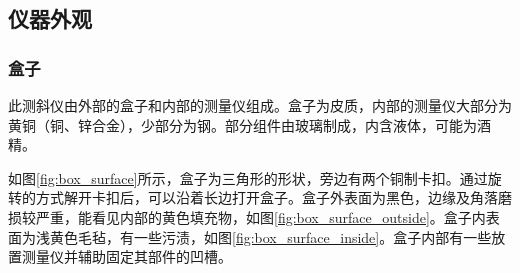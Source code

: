 \documentclass[UTF8]{ctexart}
\begin{document}
\subsection{仪器外观}

\subsubsection{盒子}

此测斜仪由外部的盒子和内部的测量仪组成。盒子为皮质，内部的测量仪大部分为黄铜（铜、锌合金），少部分为钢。部分组件由玻璃制成，内含液体，可能为酒精。\cite{Clinometer}

如图\ref{fig:box_surface}所示，盒子为三角形的形状，旁边有两个铜制卡扣。通过旋转的方式解开卡扣后，可以沿着长边打开盒子。盒子外表面为黑色，边缘及角落磨损较严重，能看见内部的黄色填充物，如图\ref{fig:box_surface_outside}。盒子内表面为浅黄色毛毡，有一些污渍，如图\ref{fig:box_surface_inside}。盒子内部有一些放置测量仪并辅助固定其部件的凹槽。
\end{document}
